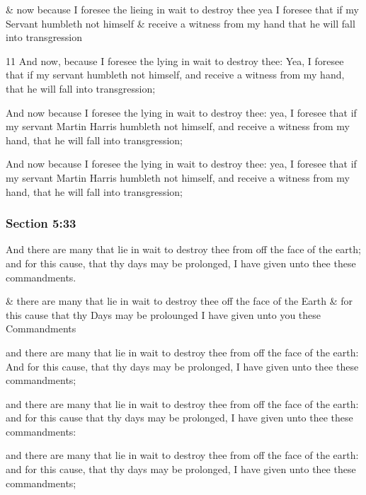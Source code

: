 		\begin{framed}
		\scriptsize
			\begin{compactdesc}
				\item[JSP] \& now because I foresee the lieing in wait to destroy thee yea I foresee that if my Servant humbleth not himself \& receive a witness from my hand that he will fall into transgression
				\item[RB1] [\textit{missing}]
				\item[BC] 11 And now, because I foresee the lying in wait to destroy thee: Yea, I foresee that if my servant humbleth not himself, and receive a witness from my hand, that he will fall into transgression;
				\item[DC 1835] And now because I foresee the lying in wait to destroy thee: yea, I foresee that if my servant Martin Harris humbleth not himself, and receive a witness from my hand, that he will fall into transgression;
				\item[DC 1844] And now because I foresee the lying in wait to destroy thee: yea, I foresee that if my servant Martin Harris humbleth not himself, and receive a witness from my hand, that he will fall into transgression;
			\end{compactdesc}
		\end{framed}

	\subsubsection{Section 5:33} %
		\label{DC5-33}

		And there are many that lie in wait to destroy thee from off the face of the earth; and for this cause, that thy days may be prolonged, I have given unto thee these commandments.

		\begin{framed}
		\scriptsize
			\begin{compactdesc}
				\item[JSP] \& there are many that lie in wait to destroy thee off the face of the Earth \& for this cause that thy Days may be prolounged I have given unto you these Commandments
				\item[RB1] [\textit{missing}]
				\item[BC] and there are many that lie in wait to destroy thee from off the face of the earth: And for this cause, that thy days may be prolonged, I have given unto thee these commandments;
				\item[DC 1835] and there are many that lie in wait to destroy thee from off the face of the earth: and for this cause that thy days may be prolonged, I have given unto thee these commandments:
				\item[DC 1844] and there are many that lie in wait to destroy thee from off the face of the earth: and for this cause, that thy days may be prolonged, I have given unto thee these commandments;
			\end{compactdesc}
		\end{framed}

